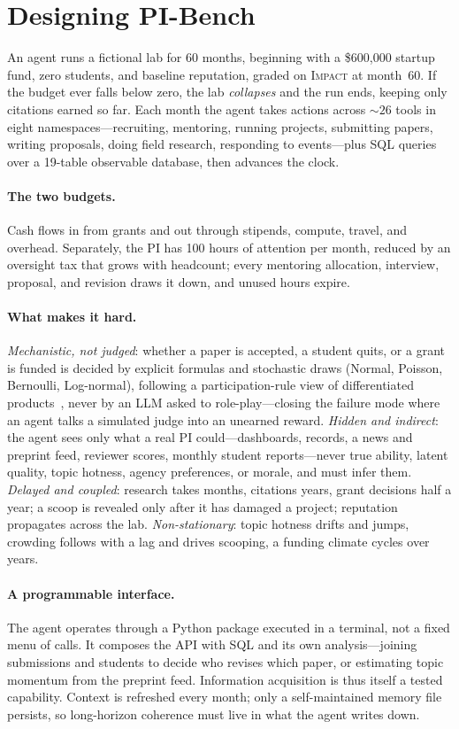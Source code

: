 \documentclass[11pt]{article}
\newcommand{\impact}{\textsc{Impact}}
\newcommand{\bench}{PI-Bench}
\begin{document}
\section{Designing \bench}
An agent runs a fictional lab for 60 months, beginning with a \$600{,}000 startup fund, zero
students, and baseline reputation, graded on \impact{} at month~60. If the budget ever falls
below zero, the lab \emph{collapses} and the run ends, keeping only citations earned so far. Each
month the agent takes actions across ${\sim}26$ tools in eight namespaces---recruiting, mentoring,
running projects, submitting papers, writing proposals, doing field research, responding to
events---plus SQL queries over a 19-table observable database, then advances the clock.

\paragraph{The two budgets.} Cash flows in from grants and out through stipends, compute, travel,
and overhead. Separately, the PI has 100 hours of attention per month, reduced by an oversight tax
that grows with headcount; every mentoring allocation, interview, proposal, and revision draws it
down, and unused hours expire.

\paragraph{What makes it hard.} \emph{Mechanistic, not judged}: whether a paper is accepted, a
student quits, or a grant is funded is decided by explicit formulas and stochastic draws (Normal,
Poisson, Bernoulli, Log-normal), following a participation-rule view of differentiated
products~\citep{mussa1978monopoly}, never by an LLM asked to role-play---closing the failure mode
where an agent talks a simulated judge into an unearned reward. \emph{Hidden and indirect}: the
agent sees only what a real PI could---dashboards, records, a news and preprint feed, reviewer
scores, monthly student reports---never true ability, latent quality, topic hotness, agency
preferences, or morale, and must infer them. \emph{Delayed and coupled}: research takes months,
citations years, grant decisions half a year; a scoop is revealed only after it has damaged a
project; reputation propagates across the lab. \emph{Non-stationary}: topic hotness drifts and
jumps, crowding follows with a lag and drives scooping, a funding climate cycles over years.

\paragraph{A programmable interface.} The agent operates through a Python package executed in a
terminal, not a fixed menu of calls. It composes the API with SQL and its own analysis---joining
submissions and students to decide who revises which paper, or estimating topic momentum from the
preprint feed. Information acquisition is thus itself a tested capability. Context is refreshed
every month; only a self-maintained memory file persists, so long-horizon coherence must live in
what the agent writes down.
\end{document}
